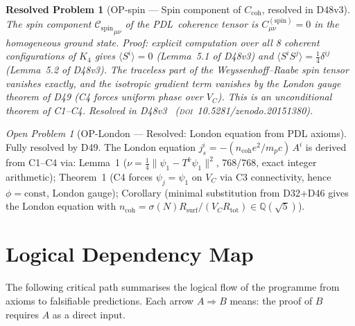 \documentclass[11pt,a4paper]{article}
\newtheorem{resolvedproblem}{Resolved Problem}
\newcommand{\Cspin}{{\mathcal{C}_{\mathrm{spin}}}}
\theoremstyle{plain}
\theoremstyle{definition}
\theoremstyle{remark}
\newtheorem{openproblem}[theorem]{Open Problem}
\newcommand{\PDL}{\textnormal{PDL}}
\newcommand{\Rsurf}{R_{\mathrm{surf}}}
\newcommand{\Rtot}{R_{\mathrm{tot}}}
\newcommand{\Ccoh}{C_{\mathrm{coh}}}
\begin{document}
\begin{resolvedproblem}[OP-spin --- Spin component of $\Ccoh$, resolved in D48v3]
\label{op:spin}
The spin component $\Cspin_{\mu\nu}$ of the \PDL\ coherence tensor is $C^{(\mathrm{spin})}_{\mu\nu} = 0$ in the homogeneous ground state. Proof: explicit computation over all 8 coherent configurations of $K_4$ gives $\langle S^i\rangle = 0$ (Lemma~5.1 of D48v3) and $\langle S^i S^j\rangle = \tfrac{1}{4}\delta^{ij}$ (Lemma~5.2 of D48v3). The traceless part of the Weyssenhoff--Raabe spin tensor vanishes exactly, and the isotropic gradient term vanishes by the London gauge theorem of D49 (C4 forces uniform phase over $V_C$). This is an unconditional theorem of C1--C4. Resolved in D48v3~\cite{D48} (\textsc{doi}~10.5281/zenodo.20151380).
\end{resolvedproblem}

\begin{openproblem}[OP-London --- Resolved: London equation from PDL axioms]
\label{op:London}
\textcolor{proofblue}{Fully resolved by D49.} The London equation $j^i_s = -(n_{\mathrm{coh}} e^2/m_p c)\,A^i$ is derived from C1--C4 via: Lemma~1 ($\nu = \tfrac{1}{4}\|\psi_1 - T^k\psi_1\|^2$, 768/768, exact integer arithmetic); Theorem~1 (C4 forces $\psi_j = \psi_1$ on $V_C$ via C3 connectivity, hence $\phi = \mathrm{const}$, London gauge); Corollary (minimal substitution from D32+D46 gives the London equation with $n_{\mathrm{coh}} = \sigma(N)\Rsurf/(V_C\Rtot) \in \mathbb{Q}(\sqrt{5})$).
\end{openproblem}

\clearpage

\section{Logical Dependency Map}
\label{sec:dependency}

The following critical path summarises the logical flow of the programme from axioms to falsifiable predictions. Each arrow $A\Rightarrow B$ means: the proof of $B$ requires $A$ as a direct input.
\end{document}
